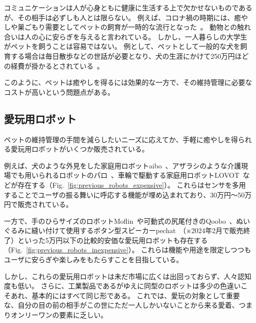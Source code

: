 \documentclass[uplatex,a4paper,12pt]{jsarticle}
\renewcommand{\figurename}{Fig.}
\newcommand{\figref}[1]{\figurename~\ref{#1}}
\begin{document}
コミュニケーションは人が心身ともに健康に生活する上で欠かせないものであるが、その相手は必ずしも人とは限らない。
例えば、コロナ禍の時期には、癒やしや巣ごもり需要としてペットの飼育が一時的な流行となった~\cite{web_pet}。
動物との触れ合いは人の心に安らぎを与えると言われている。
しかし、一人暮らしの大学生がペットを飼うことは容易ではない。
例として、ペットとして一般的な犬を飼育する場合は毎日散歩などの世話が必要となり、犬の生涯にかけて250万円ほどの経費が掛かるとされている~\cite{web_petfood}。

このように、ペットは癒やしを得るには効果的な一方で、その維持管理に必要なコストが高いという問題点がある。


\subsection{愛玩用ロボット}
ペットの維持管理の手間を減らしたいニーズに応えてか、手軽に癒やしを得られる愛玩用ロボットがいくつか販売されている。

例えば、犬のような外見をした家庭用ロボットaibo~\cite{web_aibo}、アザラシのような介護現場でも用いられるロボットのパロ~\cite{web_paro}、車輪で駆動する家庭用ロボットLOVOT~\cite{web_lovot}などが存在する（\figref{fig:previous_robots_expensive}）。
これらはセンサを多用することでユーザの振る舞いに呼応する機能が埋め込まれており、30万円～50万円で販売されている。

一方で、手のひらサイズのロボットMoflin~\cite{web_moflin}や可動式の尻尾付きのQoobo~\cite{web_qoobo}、ぬいぐるみに縫い付けて使用するボタン型スピーカーpechat~\cite{web_pechat}（※2024年2月で販売終了）といった5万円以下の比較的安価な愛玩用ロボットも存在する（\figref{fig:previous_robots_inexpensive}）。
これらは機能や用途を限定しつつもユーザに安らぎや楽しみをもたらすことを目指している。

しかし、これらの愛玩用ロボットは未だ市場に広くは出回っておらず、人々認知度も低い。
さらに、工業製品であるがゆえに同型のロボットは多少の色違いこそあれ、基本的にはすべて同じ形である。
これでは、愛玩の対象として重要な、自分の目の前の相手がこの世にただ一人しかいないことから来る愛着、つまりオンリーワンの要素に乏しい。
\end{document}
